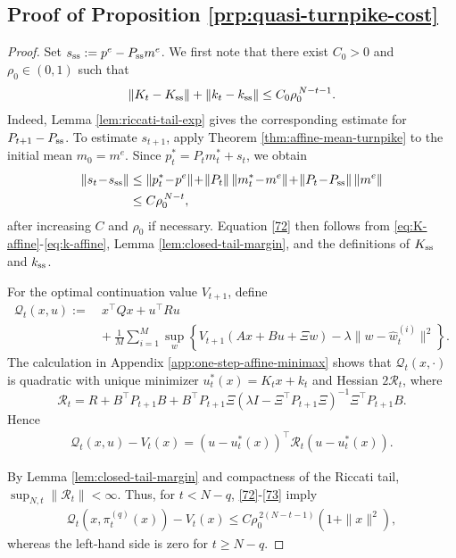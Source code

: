\documentclass[10pt,journal,twoside]{IEEEtran}
\theoremstyle{definition}
\theoremstyle{remark}
\begin{document}
\subsection{Proof of Proposition \ref{prp:quasi-turnpike-cost}}\label{app:prop4}

\begin{proof}
	Set $s_{\rm ss}:=p^e-P_{\rm ss}m^e$. We first note that there exist
	$C_0>0$ and $\rho_0\in(0,1)$ such that
	\begin{align}\label{72}
	    \|K_t-K_{\rm ss}\|+\|k_t-k_{\rm ss}\|
	\le C_0\rho_0^{\,N-t-1}.
	\end{align}
	Indeed, Lemma \ref{lem:riccati-tail-exp} gives the corresponding estimate for
	$P_{t+1}-P_{\rm ss}$. To estimate $s_{t+1}$, apply Theorem \ref{thm:affine-mean-turnpike} to the
	initial mean $m_0=m^e$. Since
	$p_t^\ast=P_tm_t^\ast+s_t$, we obtain
	\[
	\begin{aligned}
		\|s_t\!-\!s_{\rm ss}\|
		&\le
		\|p_t^\ast\!-\!p^e\|
		\!+\!\|P_t\|\,\|m_t^\ast\!-\!m^e\|
		\!+\!\|P_t\!-\!P_{\rm ss}\|\,\|m^e\|  \\
		&\le C\rho_0^{\,N-t},
	\end{aligned}
	\]
	after increasing $C$ and $\rho_0$ if necessary. Equation \eqref{72} then
	follows from \eqref{eq:K-affine}-\eqref{eq:k-affine}, Lemma \ref{lem:closed-tail-margin}, and the definitions of
	$K_{\rm ss}$ and $k_{\rm ss}$.
	
	For the optimal continuation value $V_{t+1}$, define
	\begin{align*}
	    \mathcal{Q}_t(x,u):=&~
	x^\top Qx+u^\top Ru\\
    &\!\!\!\!\!\!\!\!\!\!\!\!\!\!\!\!\!\!\!\!\!\!+
	\frac1M\sum_{i=1}^M
	\sup_w
	\left\{
	V_{t+1}(Ax+Bu+\Xi w)
	-\lambda\|w-\widehat w_t^{(i)}\|^2
	\right\}.
	\end{align*}
	The calculation in Appendix \ref{app:one-step-affine-minimax} shows that $\mathcal{Q}_t(x,\cdot)$
	is quadratic with unique minimizer $u_t^\ast(x)=K_tx+k_t$ and Hessian
	$2\mathcal{R}_t$, where
	\[
	\mathcal{R}_t
	=
	R+B^\top \!P_{t+1}B
	+B^\top \!P_{t+1}\Xi
	(\lambda I-\Xi^\top \!P_{t+1}\Xi)^{-1}
	\Xi^\top \!P_{t+1}B.
	\]
	Hence
	\begin{align}\label{73}
	    \mathcal{Q}_t(x,u)-V_t(x)
	=
	(u-u_t^\ast(x))^\top
	\mathcal{R}_t
	(u-u_t^\ast(x)).
	\end{align}
	
	By Lemma \ref{lem:closed-tail-margin} and compactness of the Riccati tail,
	$\sup_{N,t}\|\mathcal{R}_t\|<\infty$. Thus, for $t<N-q$,
	\eqref{72}-\eqref{73} imply
	\begin{align}\label{74}
	    \mathcal{Q}_t(x,\pi_t^{(q)}(x))-V_t(x)
	\le
	C\rho_0^{\,2(N-t-1)}(1+\|x\|^2),
	\end{align}
	whereas the left-hand side is zero for $t\ge N-q$.
	

\end{proof}
\end{document}
